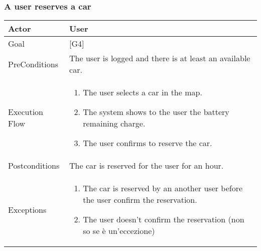 \documentclass{article}
\begin{document}
	\subsubsection{A user reserves a car}
	\begin{tabularx}{\textwidth}{  l  X  }
		\hline
		Actor & User\\
		\hline
		Goal & [G4]\\
		\hline
		PreConditions & The user is logged and there is at least an available car.\\
		\hline
		Execution Flow & \begin{enumerate}
			\item{The user selects a car in the map.}
										 \item{The system shows to the user the battery remaining charge.}
										 \item{The user confirms to reserve the car.}
										\end{enumerate}\\
		\hline
		Postconditions & The car is reserved for the user for an hour. \\
		\hline
		Exceptions & \begin{enumerate}
			\item{The car is reserved by an another user before the user confirm the reservation.}
								 \item{The user doesn't confirm the reservation (non so se è un'eccezione)}
								\end{enumerate}\\
		\hline
	\end{tabularx}
\end{document}
